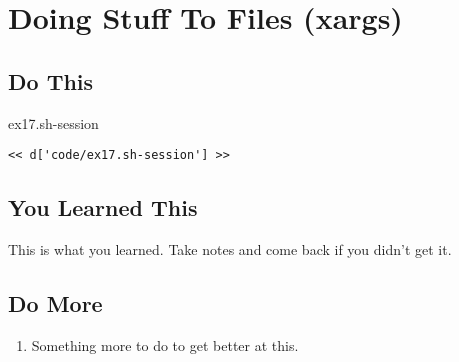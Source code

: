 \chapter{Doing Stuff To Files (xargs)}

\section{Do This}

\begin{code}{ex17.sh-session}
\begin{Verbatim}
<< d['code/ex17.sh-session'] >>
\end{Verbatim}
\end{code}


\section{You Learned This}

This is what you learned.  Take notes and come back if you didn't get it.

\section{Do More}

\begin{enumerate}
\item Something more to do to get better at this.
\end{enumerate}

